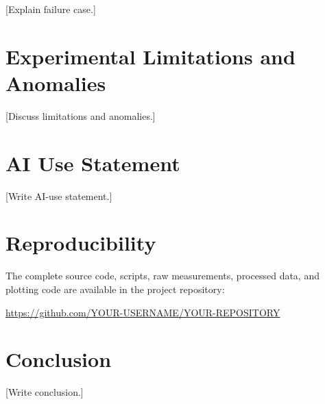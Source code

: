 \documentclass[11pt]{article}
\begin{document}
%

[Explain failure case.]

\section{Experimental Limitations and Anomalies}

%

[Discuss limitations and anomalies.]

\section{AI Use Statement}

%
%

[Write AI-use statement.]

\section{Reproducibility}

%

The complete source code, scripts, raw measurements, processed data,
and plotting code are available in the project repository:

\begin{center}
    \url{https://github.com/YOUR-USERNAME/YOUR-REPOSITORY}
\end{center}

\section{Conclusion}

%
%

[Write conclusion.]
\end{document}
